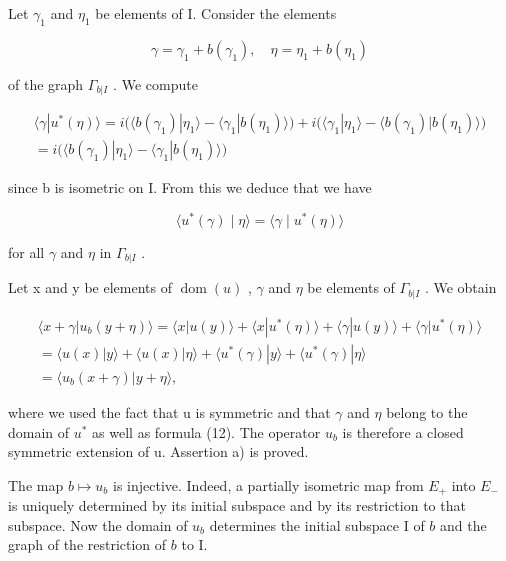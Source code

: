 Let \(\gamma_{1}\) and \(\eta_{1}\) be elements of I. Consider the elements

\[
\gamma = \gamma_ {1} + b (\gamma_ {1}), \quad \eta = \eta_ {1} + b (\eta_ {1})
\]

of the graph \(\Gamma_{b|I}\) . We compute

\[
\begin{array}{c} \langle \gamma | u ^ {*} (\eta) \rangle = i \big (\langle b (\gamma_ {1}) | \eta_ {1} \rangle - \langle \gamma_ {1} | b (\eta_ {1}) \rangle \big) + i \big (\langle \gamma_ {1} | \eta_ {1} \rangle - \langle b (\gamma_ {1}) | b (\eta_ {1}) \rangle \big) \\ = i \big (\langle b (\gamma_ {1}) | \eta_ {1} \rangle - \langle \gamma_ {1} | b (\eta_ {1}) \rangle \big) \end{array}
\]

since b is isometric on I. From this we deduce that we have

\[
\langle u ^ {*} (\gamma) \mid \eta \rangle = \langle \gamma \mid u ^ {*} (\eta) \rangle\tag{12}
\]

for all \(\gamma\) and \(\eta\) in \(\Gamma_{b|I}\) .

Let x and y be elements of \(\operatorname{dom}(u)\) , \(\gamma\) and \(\eta\) be elements of \(\Gamma_{b|I}\) . We obtain

\[
\begin{array}{c} \langle x + \gamma | u _ {b} (y + \eta) \rangle = \langle x | u (y) \rangle + \langle x | u ^ {*} (\eta) \rangle + \langle \gamma | u (y) \rangle + \langle \gamma | u ^ {*} (\eta) \rangle \\ = \langle u (x) | y \rangle + \langle u (x) | \eta \rangle + \langle u ^ {*} (\gamma) | y \rangle + \langle u ^ {*} (\gamma) | \eta \rangle \\ = \langle u _ {b} (x + \gamma) | y + \eta \rangle , \end{array}
\]

where we used the fact that u is symmetric and that \(\gamma\) and \(\eta\) belong to the domain of \(u^{*}\) as well as formula (12). The operator \(u_{b}\) is therefore a closed symmetric extension of u. Assertion a) is proved.

The map \(b \mapsto u_b\) is injective. Indeed, a partially isometric map from \(E_+\) into \(E_-\) is uniquely determined by its initial subspace and by its restriction to that subspace. Now the domain of \(u_b\) determines the initial subspace I of \(b\) and the graph of the restriction of \(b\) to I.

